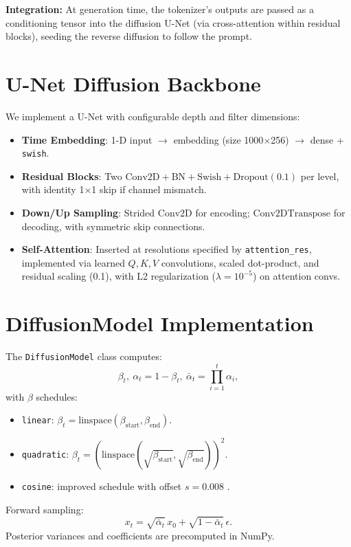 \documentclass[12pt]{report}
\begin{document}
\noindent\textbf{Integration:}  
At generation time, the tokenizer’s outputs are passed as a conditioning tensor into the diffusion U-Net (via cross-attention within residual blocks), seeding the reverse diffusion to follow the prompt.

\section{U-Net Diffusion Backbone}

We implement a U-Net with configurable depth and filter dimensions:

\begin{itemize}
  \item \textbf{Time Embedding}: 1-D input \(\to\) embedding (size 1000\(\times\)256) \(\to\) dense + \texttt{swish}.
  \item \textbf{Residual Blocks}: Two \(\mathrm{Conv2D}\!+\!\mathrm{BN}\!+\!\mathrm{Swish}\!+\!\mathrm{Dropout}(0.1)\) per level, with identity 1\(\times\)1 skip if channel mismatch.
  \item \textbf{Down/Up Sampling}: Strided \(\mathrm{Conv2D}\) for encoding; \(\mathrm{Conv2DTranspose}\) for decoding, with symmetric skip connections.
  \item \textbf{Self-Attention}: Inserted at resolutions specified by \texttt{attention\_res}, implemented via learned \(Q,K,V\) convolutions, scaled dot-product, and residual scaling (0.1), with L2 regularization (\(\lambda=10^{-5}\)) on attention convs.
\end{itemize}

\section{DiffusionModel Implementation}

The \texttt{DiffusionModel} class computes:
\[
\beta_t,\ \alpha_t = 1-\beta_t,\ \bar\alpha_t = \prod_{i=1}^t \alpha_i,
\]
with \(\beta\) schedules:
\begin{itemize}
  \item \texttt{linear}: \(\beta_t=\mathrm{linspace}(\beta_{\mathrm{start}},\beta_{\mathrm{end}})\).
  \item \texttt{quadratic}: \(\beta_t=(\mathrm{linspace}(\sqrt{\beta_{\mathrm{start}}},\sqrt{\beta_{\mathrm{end}}}))^2\).
  \item \texttt{cosine}: improved schedule with offset \(s=0.008\) \cite{NicholDhariwal2021}.
\end{itemize}
Forward sampling:
\[
x_t = \sqrt{\bar\alpha_t}\,x_0 + \sqrt{1-\bar\alpha_t}\,\epsilon.
\]
Posterior variances and coefficients are precomputed in NumPy.
\end{document}
